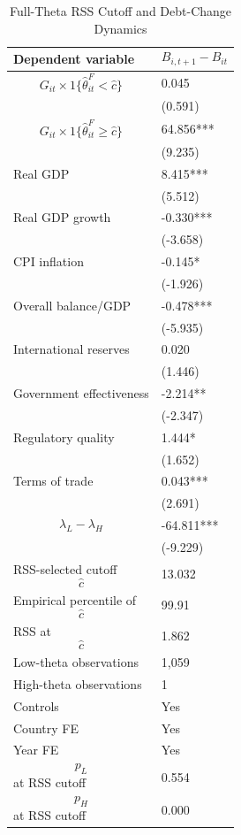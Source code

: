 \begin{table}[H]\centering
\begin{threeparttable}
\caption{Full-Theta RSS Cutoff and Debt-Change Dynamics}
\label{tab:deltaB_rss_cutoff_fulltheta}
\scriptsize
\begin{tabularx}{\textwidth}{lY}
\toprule
Dependent variable & $$B_{i,t+1}-B_{it}$$ \\
\midrule
$$G_{it}\times 1\{\widehat{\theta}^{F}_{it}<\widehat{c}\}$$ & 0.045 \\
 & (0.591) \\
$$G_{it}\times 1\{\widehat{\theta}^{F}_{it}\geq\widehat{c}\}$$ & 64.856*** \\
 & (9.235) \\
Real GDP & 8.415*** \\
 & (5.512) \\
Real GDP growth & -0.330*** \\
 & (-3.658) \\
CPI inflation & -0.145* \\
 & (-1.926) \\
Overall balance/GDP & -0.478*** \\
 & (-5.935) \\
International reserves & 0.020 \\
 & (1.446) \\
Government effectiveness & -2.214** \\
 & (-2.347) \\
Regulatory quality & 1.444* \\
 & (1.652) \\
Terms of trade & 0.043*** \\
 & (2.691) \\
$$\lambda_L-\lambda_H$$ & -64.811*** \\
 & (-9.229) \\
\midrule
RSS-selected cutoff $$\widehat{c}$$ & 13.032 \\
Empirical percentile of $$\widehat{c}$$ & 99.91 \\
RSS at $$\widehat{c}$$ & 1.862 \\
Low-theta observations & 1,059 \\
High-theta observations & 1 \\
Controls & Yes \\
Country FE & Yes \\
Year FE & Yes \\
$$p_L$$ at RSS cutoff & 0.554 \\
$$p_H$$ at RSS cutoff & 0.000 \\

\end{tabularx}
\end{threeparttable}
\end{table}
